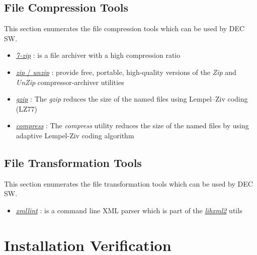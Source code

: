 \documentclass[dec_sum_main.tex]{subfiles}
\begin{document}
\subsection{File Compression Tools}
This section enumerates the file compression tools which can be used by DEC SW.
\par
\begin{itemize}
	\item \href{https://www.7-zip.org/}{\textit{7-zip}} : is a file archiver with a high compression ratio
	\item \href{http://infozip.sourceforge.net}{\textit{zip} / \textit{unzip}} : provide free, portable, high-quality versions of the \textit{Zip} and \textit{UnZip} compressor-archiver utilities
	\item \href{https://www.gzip.org}{\textit{gzip}} : The \textit{gzip} reduces the size of the named files using Lempel–Ziv coding (LZ77)
	\item \href{http://man7.org/linux/man-pages/man1/compress.1p.html}{\textit{compress}} : The \textit{compress} utility reduces the size of the named files by using adaptive Lempel-Ziv coding algorithm
\end{itemize}

\subsection{File Transformation Tools}
This section enumerates the file transformation tools which can be used by DEC SW.

\begin{itemize}
	\item \href{http://xmlsoft.org/xmllint.html}{\textit{xmllint}} : is a command line XML parser which is part of the \href{http://xmlsoft.org}{\textit{libxml2}} utils
\end{itemize}

\section{Installation Verification}
\end{document}
